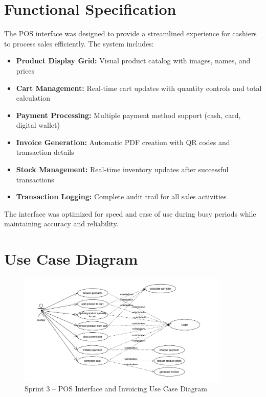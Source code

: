 \section{Functional Specification}

The POS interface was designed to provide a streamlined experience for cashiers to process sales efficiently. The system includes:

\begin{itemize}
  \item \textbf{Product Display Grid:} Visual product catalog with images, names, and prices
  \item \textbf{Cart Management:} Real-time cart updates with quantity controls and total calculation
  \item \textbf{Payment Processing:} Multiple payment method support (cash, card, digital wallet)
  \item \textbf{Invoice Generation:} Automatic PDF creation with QR codes and transaction details
  \item \textbf{Stock Management:} Real-time inventory updates after successful transactions
  \item \textbf{Transaction Logging:} Complete audit trail for all sales activities
\end{itemize}

The interface was optimized for speed and ease of use during busy periods while maintaining accuracy and reliability.

\section{Use Case Diagram}

\begin{figure}[H]
  \centering
  \includegraphics[width=0.9\textwidth]{figures/images/sprint3usecase.png}
  \caption{Sprint 3 – POS Interface and Invoicing Use Case Diagram}
  \label{fig:sprint3-usecase}
\end{figure}

